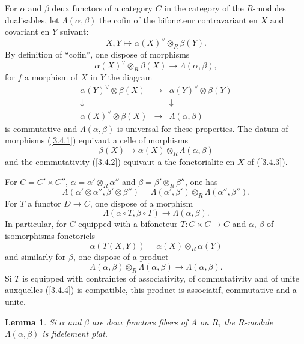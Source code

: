 \documentclass[11pt,a4paper]{article}
\theoremstyle{plain}
\newtheorem{lemma}[theorem]{Lemma}
\theoremstyle{definition}
\begin{document}
For $\alpha$ and $\beta$ deux functors of a category $C$ in the category of the $R$-modules dualisables, let $\Lambda(\alpha,\beta)$ the cofin of the bifoncteur contravariant en $X$ and covariant en $Y$ suivant:
\[
X,Y\mapsto\alpha(X)^\vee\otimes_R\beta(Y).
\]
By definition of ``cofin'', one dispose of morphisms
\begin{equation}\label{3.4.1}
\alpha(X)^\vee\otimes_R\beta(X)\to\Lambda(\alpha,\beta),
\end{equation}
for $f$ a morphism of $X$ in $Y$ the diagram
\begin{equation}\label{3.4.2}
\begin{matrix}
\alpha(Y)^\vee\otimes\beta(X) & \longrightarrow & \alpha(Y)^\vee\otimes\beta(Y)\\
\downarrow & & \downarrow\\
\alpha(X)^\vee\otimes\beta(X) & \longrightarrow & \Lambda(\alpha,\beta)
\end{matrix}
\end{equation}
is commutative and $\Lambda(\alpha,\beta)$ is universal for these properties. The datum of morphisms (\ref{3.4.1}) equivaut a celle of morphisms
\begin{equation}\label{3.4.3}
\beta(X)\to\alpha(X)\otimes_R\Lambda(\alpha,\beta)
\end{equation}
and the commutativity (\ref{3.4.2}) equivaut a the fonctorialite en $X$ of (\ref{3.4.3}).

For $C=C'\times C''$, $\alpha=\alpha'\otimes_R\alpha''$ and $\beta=\beta'\otimes_R\beta''$, one has
\[
\Lambda(\alpha'\otimes\alpha'',\beta'\otimes\beta'')=\Lambda(\alpha',\beta')\otimes_R\Lambda(\alpha'',\beta'').
\]
For $T$ a functor $D\to C$, one dispose of a morphism
\[
\Lambda(\alpha\circ T,\beta\circ T)\to\Lambda(\alpha,\beta).
\]
In particular, for $C$ equipped with a bifoncteur $T:C\times C\to C$ and $\alpha$, $\beta$ of isomorphisms fonctoriels
\begin{equation}\label{3.4.4}
\alpha(T(X,Y))=\alpha(X)\otimes_R\alpha(Y)
\end{equation}
and similarly for $\beta$, one dispose of a product
\begin{equation}\label{3.4.5}
\Lambda(\alpha,\beta)\otimes_R\Lambda(\alpha,\beta)\to\Lambda(\alpha,\beta).
\end{equation}
Si $T$ is equipped with contraintes of associativity, of commutativity and of unite auxquelles (\ref{3.4.4}) is compatible, this product is associatif, commutative and a unite.

\begin{lemma}\label{3.5}
Si $\alpha$ and $\beta$ are deux functors fibers of $A$ on $R$, the $R$-module $\Lambda(\alpha,\beta)$ is fidelement plat.
\end{lemma}
\end{document}
